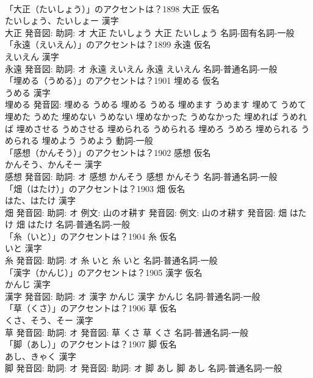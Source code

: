 \documentclass[8pt]{extreport}
\begin{document}
\begin{CJK}{UTF8}{min}
\\	「大正（たいしょう）」のアクセントは？1898	大正 仮名　
\\	たいしょう、たいしょー 漢字　
\\	大正 発音図: 助詞: オ	大正 たいしょう		大正 たいしょう				名詞-固有名詞-一般 
\\	「永遠（えいえん）」のアクセントは？1899	永遠 仮名　
\\	えいえん 漢字　
\\	永遠 発音図: 助詞: オ	永遠 えいえん		永遠 えいえん				名詞-普通名詞-一般 
\\	「埋める（うめる）」のアクセントは？1901	埋める 仮名　
\\	うめる 漢字　
\\	埋める 発音図:	埋める うめる		埋める うめる 埋めます うめます 埋めて うめて 埋めた うめた 埋めない うめない 埋めなかった うめなかった 埋めれば うめれば 埋めさせる うめさせる 埋められる うめられる 埋めろ うめろ 埋められる うめられる 埋めよう うめよう				動詞-一般 
\\	「感想（かんそう）」のアクセントは？1902	感想 仮名　
\\	かんそう、かんそー 漢字　
\\	感想 発音図: 助詞: オ	感想 かんそう		感想 かんそう				名詞-普通名詞-一般 
\\	「畑（はたけ）」のアクセントは？1903	畑 仮名　
\\	はた、はたけ 漢字　
\\	畑 発音図: 助詞: オ 例文: 山のオ耕す 発音図: 例文: 山のオ耕す 発音図:	畑 はたけ		畑 はたけ				名詞-普通名詞-一般 
\\	「糸（いと）」のアクセントは？1904	糸 仮名　
\\	いと 漢字　
\\	糸 発音図: 助詞: オ	糸 いと		糸 いと				名詞-普通名詞-一般 
\\	「漢字（かんじ）」のアクセントは？1905	漢字 仮名　
\\	かんじ 漢字　
\\	漢字 発音図: 助詞: オ	漢字 かんじ		漢字 かんじ				名詞-普通名詞-一般 
\\	「草（くさ）」のアクセントは？1906	草 仮名　
\\	くさ、そう、そー 漢字　
\\	草 発音図: 助詞: オ 発音図:	草 くさ		草 くさ				名詞-普通名詞-一般 
\\	「脚（あし）」のアクセントは？1907	脚 仮名　
\\	あし、きゃく 漢字　
\\	脚 発音図: 助詞: オ 発音図: 助詞: オ	脚 あし		脚 あし				名詞-普通名詞-一般 

\end{CJK}
\end{document}
